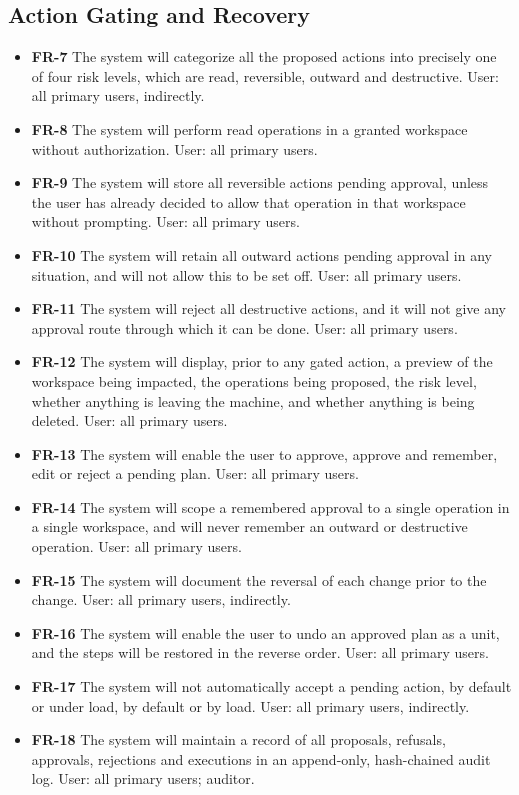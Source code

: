 \documentclass{FastFyp}
\begin{document}
\subsection{Action Gating and Recovery}
\begin{itemize}
    \item \textbf{FR-7} The system will categorize all the proposed actions into precisely one of four risk levels, which are read, reversible, outward and destructive. User: all primary users, indirectly.
    \item \textbf{FR-8} The system will perform read operations in a granted workspace without authorization. User: all primary users.
    \item \textbf{FR-9} The system will store all reversible actions pending approval, unless the user has already decided to allow that operation in that workspace without prompting. User: all primary users.
    \item \textbf{FR-10} The system will retain all outward actions pending approval in any situation, and will not allow this to be set off. User: all primary users.
    \item \textbf{FR-11} The system will reject all destructive actions, and it will not give any approval route through which it can be done. User: all primary users.
    \item \textbf{FR-12} The system will display, prior to any gated action, a preview of the workspace being impacted, the operations being proposed, the risk level, whether anything is leaving the machine, and whether anything is being deleted. User: all primary users.
    \item \textbf{FR-13} The system will enable the user to approve, approve and remember, edit or reject a pending plan. User: all primary users.
    \item \textbf{FR-14} The system will scope a remembered approval to a single operation in a single workspace, and will never remember an outward or destructive operation. User: all primary users.
    \item \textbf{FR-15} The system will document the reversal of each change prior to the change. User: all primary users, indirectly.
    \item \textbf{FR-16} The system will enable the user to undo an approved plan as a unit, and the steps will be restored in the reverse order. User: all primary users.
    \item \textbf{FR-17} The system will not automatically accept a pending action, by default or under load, by default or by load. User: all primary users, indirectly.
    \item \textbf{FR-18} The system will maintain a record of all proposals, refusals, approvals, rejections and executions in an append-only, hash-chained audit log. User: all primary users; auditor.
\end{itemize}
\end{document}
